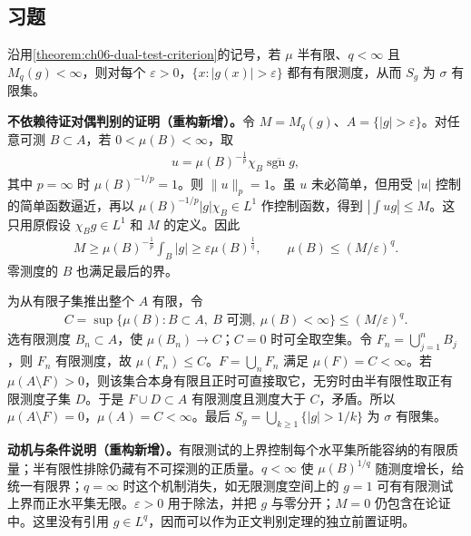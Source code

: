 \documentclass[../../main.tex]{subfiles}
\begin{document}
\subsection*{习题}
\begin{exercise}\label{exercise:ch06-test-sigma-support}
沿用\cref{theorem:ch06-dual-test-criterion}的记号，若 $\mu$ 半有限、$q<\infty$ 且 $M_q(g)<\infty$，则对每个 $\varepsilon>0$，$\{x:|g(x)|>\varepsilon\}$ 都有有限测度，从而 $S_g$ 为 $\sigma$ 有限集。
\end{exercise}
\begin{solution}
\textbf{不依赖待证对偶判别的证明（重构新增）。}令 $M=M_q(g)$、$A=\{|g|>\varepsilon\}$。对任意可测 $B\subset A$，若 $0<\mu(B)<\infty$，取
\begin{align*}
u=\mu(B)^{-\frac1p}\chi_B\overline{\operatorname{sgn}g},
\end{align*}
其中 $p=\infty$ 时 $\mu(B)^{-1/p}=1$。则 $\|u\|_p=1$。虽 $u$ 未必简单，但用受 $|u|$ 控制的简单函数逼近，再以 $\mu(B)^{-1/p}|g|\chi_B\in L^1$ 作控制函数，得到 $|\int ug|\leqslant M$。这只用原假设 $\chi_Bg\in L^1$ 和 $M$ 的定义。因此
\begin{align*}
M\geqslant\mu(B)^{-\frac1p}\int_B|g|
\geqslant\varepsilon\mu(B)^{\frac1q},
\qquad \mu(B)\leqslant(M/\varepsilon)^q.
\end{align*}
零测度的 $B$ 也满足最后的界。

为从有限子集推出整个 $A$ 有限，令
\begin{align*}
C=\sup\{\mu(B):B\subset A,\ B\text{ 可测},\ \mu(B)<\infty\}\leqslant(M/\varepsilon)^q.
\end{align*}
选有限测度 $B_n\subset A$，使 $\mu(B_n)\to C$；$C=0$ 时可全取空集。令 $F_n=\bigcup_{j=1}^nB_j$，则 $F_n$ 有限测度，故 $\mu(F_n)\leqslant C$。$F=\bigcup_nF_n$ 满足 $\mu(F)=C<\infty$。若 $\mu(A\setminus F)>0$，则该集合本身有限且正时可直接取它，无穷时由半有限性取正有限测度子集 $D$。于是 $F\cup D\subset A$ 有限测度且测度大于 $C$，矛盾。所以 $\mu(A\setminus F)=0$，$\mu(A)=C<\infty$。最后 $S_g=\bigcup_{k\geqslant1}\{|g|>1/k\}$ 为 $\sigma$ 有限集。
\end{solution}
\begin{remark}
\textbf{动机与条件说明（重构新增）。}有限测试的上界控制每个水平集所能容纳的有限质量；半有限性排除仍藏有不可探测的正质量。$q<\infty$ 使 $\mu(B)^{1/q}$ 随测度增长，给统一有限界；$q=\infty$ 时这个机制消失，如无限测度空间上的 $g=1$ 可有有限测试上界而正水平集无限。$\varepsilon>0$ 用于除法，并把 $g$ 与零分开；$M=0$ 仍包含在论证中。这里没有引用 $g\in L^q$，因而可以作为正文判别定理的独立前置证明。
\end{remark}
\end{document}
